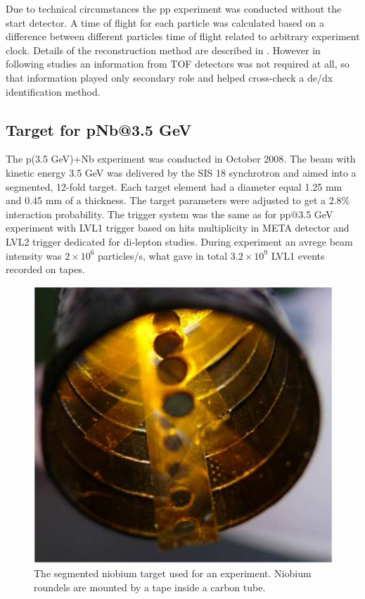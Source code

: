 Due to technical circumstances the pp experiment was conducted without the start detector. A time of flight for each particle was calculated based on a difference between different particles time of flight related to arbitrary experiment clock. Details of the reconstruction method are described in \cite{dybczak_phd}. However in following studies an information from TOF detectors was not required at all, so that information played only secondary role and helped cross-check a de/dx identification method.

\subsection{Target for pNb@3.5 GeV}
The p(3.5 GeV)+Nb experiment was conducted in October 2008. The beam with kinetic energy 3.5 GeV was delivered by the SIS 18 synchrotron and aimed into a segmented, 12-fold target. Each target element had a diameter equal 1.25 mm and 0.45 mm of a thickness. The target parameters were adjusted to get a 2.8\% interaction probability. The trigger system was the same as for pp@3.5 GeV experiment with LVL1 trigger based on hits multiplicity in META detector and LVL2 trigger dedicated for di-lepton studies. During experiment an avrege beam intensity was $2 \times 10^6$ particles/s, what gave in total $3.2 \times 10^9$ LVL1 events recorded on tapes.  

\begin{figure}[ht]
  \centering
  \includegraphics[width=0.7 \linewidth]{Chapter_analysisPNb/target_pNb.eps}
  \caption{The segmented niobium target used for an experiment. Niobium roundels are mounted by a tape inside a carbon tube.}
\end{figure}



